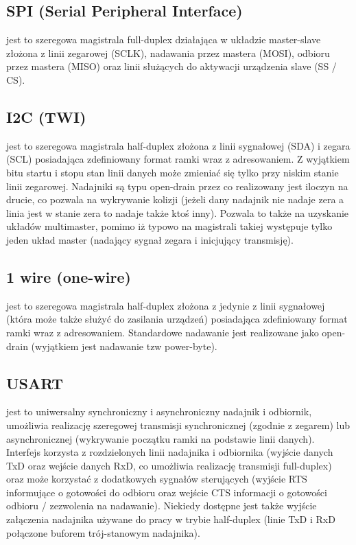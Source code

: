 \documentclass{pdfBooklets}
\begin{document}
\subsection{SPI (Serial Peripheral Interface)}
    jest to szeregowa magistrala full-duplex działająca w układzie master-slave złożona z linii zegarowej (SCLK), nadawania przez mastera (MOSI), odbioru przez mastera (MISO) oraz linii służących do aktywacji urządzenia slave (SS / CS). 
\subsection{I2C (TWI)}
    jest to szeregowa magistrala half-duplex złożona z linii sygnałowej (SDA) i zegara (SCL) posiadająca zdefiniowany format ramki wraz z adresowaniem. Z wyjątkiem bitu startu i stopu stan linii danych może zmieniać się tylko przy niskim stanie linii zegarowej.
    Nadajniki są typu open-drain przez co realizowany jest iloczyn na drucie, co pozwala na wykrywanie kolizji (jeżeli dany nadajnik nie nadaje zera a linia jest w stanie zera to nadaje także ktoś inny). Pozwala to także na uzyskanie układów multimaster, pomimo iż typowo na magistrali takiej występuje tylko jeden układ master (nadający sygnał zegara i inicjujący transmisję). 
\subsection{1 wire (one-wire)}
    jest to szeregowa magistrala half-duplex złożona z jedynie z linii sygnałowej (która może także służyć do zasilania urządzeń) posiadająca zdefiniowany format ramki wraz z adresowaniem. Standardowe nadawanie jest realizowane jako open-drain (wyjątkiem jest nadawanie tzw power-byte). 
\subsection{USART}
    jest to uniwersalny synchroniczny i asynchroniczny nadajnik i odbiornik, umożliwia realizację szeregowej transmisji synchronicznej (zgodnie z zegarem) lub asynchronicznej (wykrywanie początku ramki na podstawie linii danych). Interfejs korzysta z rozdzielonych linii nadajnika i odbiornika (wyjście danych TxD oraz wejście danych RxD, co umożliwia realizację transmisji full-duplex) oraz może korzystać z dodatkowych sygnałów sterujących (wyjście RTS informujące o gotowości do odbioru oraz wejście CTS informacji o gotowości odbioru / zezwolenia na nadawanie). Niekiedy dostępne jest także wyjście załączenia nadajnika używane do pracy w trybie half-duplex (linie TxD i RxD połączone buforem trój-stanowym nadajnika).
\end{document}
